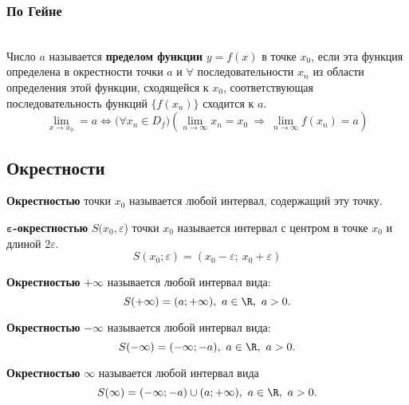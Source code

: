 \subsubsection{По Гейне}

\begin{definition}\ \\
  Число $a$ называется \textbf{пределом функции} $y = f\left( x \right) $ в точке $x_0$, если эта функция определена в окрестности точки $a$ и $\forall$ последовательности $x_{n}$ из области определения этой функции, сходящейся к $x_0$, соответствующая последовательность функций $\{f(x_{n})\}$ сходится к $a$.
  \[
  \lim_{x \to x_0} = a \iff \big(\forall x_{n}\in D_f\big)\left(\lim\limits_{n \to \infty} x_{n} = x_0\ \Rightarrow\ \lim\limits_{n \to \infty} f(x_{n}) = a\right) 
  \] 
\end{definition}
\newpage
\subsection{Окрестности}

\begin{definition}
  \textbf{Окрестностью} точки $x_0$ называется любой интервал, содержащий эту точку.
\end{definition}

\begin{definition}
  $\bm{\varepsilon}$\textbf{-окрестностью} $S(x_0, \varepsilon$) точки $x_0$ называется интервал с центром в точке $x_0$ и длиной 2$\varepsilon$.
  \[
  S(x_0; \varepsilon) = (x_0 - \varepsilon;\ x_0 + \varepsilon)
  \] 
\end{definition}

\begin{definition}
  \textbf{Окрестностью} $\bm{+\infty}$ называется любой интервал вида:
  \[
  S(+\infty) = (a; +\infty),\ a\in \R,\ a > 0
  .\] 
\end{definition}

\begin{definition}
  \textbf{Окрестностью} $\bm{-\infty}$ называется любой интервал вида:
  \[
  S(-\infty) = (-\infty; -a),\ a\in \R,\ a > 0
  .\] 
\end{definition}

\begin{definition}
  \textbf{Окрестностью} $\bm{\infty}$ называется любой интервал вида
  \[
  S(\infty) = (-\infty; -a) \cup (a; +\infty),\ a\in \R,\ a > 0
  .\] 
\end{definition}

